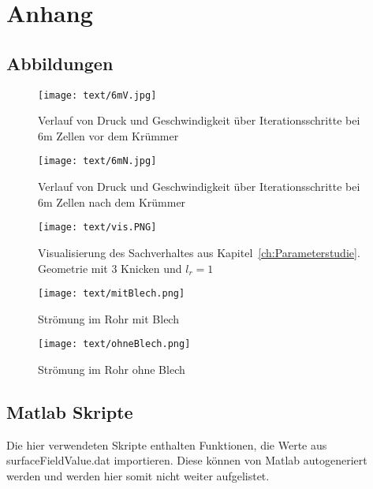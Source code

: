 
\appendix
\chapter{Anhang}
\label{ch:Anhang}
\section{Abbildungen}
\begin{figure}[H]
    \centering
    \texttt{[image: text/6mV.jpg]}
    \caption{Verlauf von Druck und Geschwindigkeit über Iterationsschritte bei 6m Zellen vor dem Krümmer}
    \label{app:6mV}
\end{figure}

		

\begin{figure}[H]
    \centering
    \texttt{[image: text/6mN.jpg]}
    \caption{Verlauf von Druck und Geschwindigkeit über Iterationsschritte bei 6m Zellen nach dem Krümmer}
    \label{app:6mN}
\end{figure}

\begin{figure}[H]
    \centering
    \texttt{[image: text/vis.PNG]}
    \caption{Visualisierung des Sachverhaltes aus Kapitel~\ref{ch:Parameterstudie}. Geometrie mit 3 Knicken und $l_r = 1$}
    \label{app:vis}
\end{figure}

\begin{figure}[H]
    \centering
    \texttt{[image: text/mitBlech.png]}
    \caption{Strömung im Rohr mit Blech}
    \label{fig:mB}
\end{figure}

\begin{figure}[H]
    \centering
    \texttt{[image: text/ohneBlech.png]}
    \caption{Strömung im Rohr ohne Blech}
    \label{fig:oB}
\end{figure}

\clearpage
\section{Matlab Skripte}

Die hier verwendeten Skripte enthalten Funktionen, die Werte aus surfaceFieldValue.dat importieren. Diese können von Matlab autogeneriert werden und werden hier somit nicht weiter aufgelistet.


